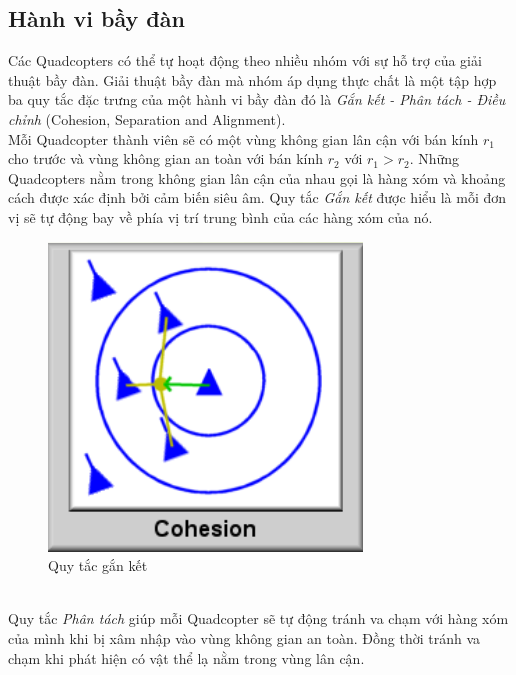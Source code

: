 			\subsection{Hành vi bầy đàn}
			Các Quadcopters có thể tự hoạt động theo nhiều nhóm với sự hỗ trợ của giải thuật bầy đàn. Giải thuật bầy đàn mà nhóm áp dụng thực chất là một tập hợp ba quy tắc đặc trưng của một hành vi bầy đàn đó là \textit{Gắn kết - Phân tách - Điều chỉnh} (Cohesion, Separation and Alignment).  \\
			Mỗi Quadcopter thành viên sẽ có một vùng không gian lân cận với bán kính $r_{1}$ cho trước và vùng không gian an toàn với bán kính $r_{2}$ với $r_{1}>r_{2}$. Những Quadcopters nằm trong không gian lân cận của nhau gọi là hàng xóm và khoảng cách được xác định bởi cảm biến siêu âm. Quy tắc \textit{Gắn kết} được hiểu là mỗi đơn vị sẽ tự động bay về phía vị trí trung bình của các hàng xóm của nó. 
			\begin{figure}[h!]
	        	\begin{center}
	        		\includegraphics[scale=0.4]{images/cohesion.png}
	        		\caption{Quy tắc gắn kết}
	        	\end{center}
        \end{figure}
        \\
        Quy tắc \textit{Phân tách} giúp mỗi Quadcopter sẽ tự động tránh va chạm với hàng xóm của mình khi bị xâm nhập vào vùng không gian an toàn. Đồng thời tránh va chạm khi phát hiện có vật thể lạ nằm trong vùng lân cận.
